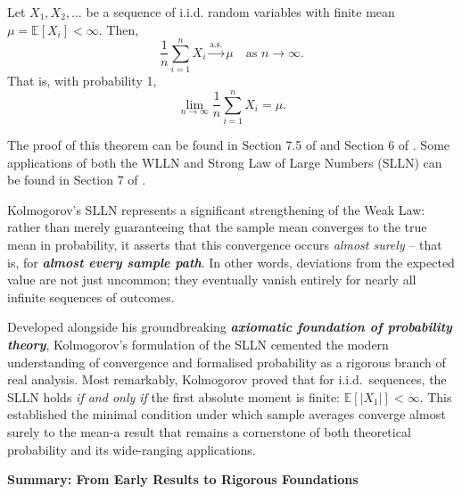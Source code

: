 \begin{theorem}
Let \( X_1, X_2, \dots \) be a sequence of i.i.d. random variables with finite mean \( \mu = \mathbb{E}[X_i] < \infty \). Then,
\[
\frac{1}{n} \sum_{i=1}^n X_i \xrightarrow{\text{a.s.}} \mu \quad \text{as } n \to \infty.
\]
That is, with probability 1,
\[
\lim_{n \to \infty} \frac{1}{n} \sum_{i=1}^n X_i = \mu.
\]
\end{theorem}

The proof of this theorem can be found in Section 7.5 of \cite{grimmett2014probability} and Section 6 of \cite{billingsley2013convergence}. Some applications of both the WLLN and Strong Law of Large Numbers (SLLN) can be found in Section 7 of \cite{proschan2018essentials}.

Kolmogorov’s SLLN represents a significant strengthening of the Weak Law: rather than merely guaranteeing that the sample mean converges to the true mean in probability, it asserts that this convergence occurs \emph{almost surely} -- that is, for \textbf{\textit{almost every sample path}}. In other words, deviations from the expected value are not just uncommon; they eventually vanish entirely for nearly all infinite sequences of outcomes.

Developed alongside his groundbreaking \textbf{\textit{axiomatic foundation of probability theory}}, Kolmogorov’s formulation of the SLLN cemented the modern understanding of convergence and formalised probability as a rigorous branch of real analysis. Most remarkably, Kolmogorov proved that for i.i.d.\ sequences, the SLLN holds \emph{if and only if} the first absolute moment is finite: \( \mathbb{E}[|X_1|] < \infty \). This established the minimal condition under which sample averages converge almost surely to the mean-a result that remains a cornerstone of both theoretical probability and its wide-ranging  \newline applications.

\noindent\textbf{Summary: From Early Results to Rigorous Foundations}


